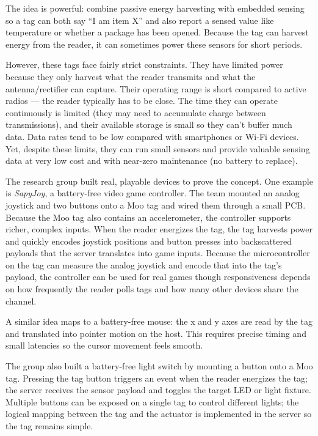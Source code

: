 The idea is powerful: combine passive energy harvesting with embedded sensing so a tag can both say “I am item X” and also report a sensed value like temperature or whether a package has been opened. Because the tag can harvest energy from the reader, it can sometimes power these sensors for short periods.

However, these tags face fairly strict constraints. They have limited power because they only harvest what the reader transmits and what the antenna/rectifier can capture. Their operating range is short compared to active radios — the reader typically has to be close. The time they can operate continuously is limited (they may need to accumulate charge between transmissions), and their available storage is small so they can’t buffer much data. Data rates tend to be low compared with smartphones or Wi-Fi devices. Yet, despite these limits, they can run small sensors and provide valuable sensing data at very low cost and with near-zero maintenance (no battery to replace).

The research group built real, playable devices to prove the concept.
One example is \textit{SapyJoy}, a battery-free video game controller. The team mounted an analog joystick and two buttons onto a Moo tag and wired them through a small PCB. Because the Moo tag also contains an accelerometer, the controller supports richer, complex inputs. When the reader energizes the tag, the tag harvests power and quickly encodes joystick positions and button presses into backscattered payloads that the server translates into game inputs. Because the microcontroller on the tag can measure the analog joystick and encode that into the tag’s payload, the controller can be used for real games though responsiveness depends on how frequently the reader polls tags and how many other devices share the channel.

A similar idea maps to a battery-free mouse: the x and y axes are read by the tag and translated into pointer motion on the host. This requires precise timing and small latencies so the cursor movement feels smooth.

The group also built a battery-free light switch by mounting a button onto a Moo tag. Pressing the tag button triggers an event when the reader energizes the tag; the server receives the sensor payload and toggles the target LED or light fixture. Multiple buttons can be exposed on a single tag to control different lights; the logical mapping between the tag and the actuator is implemented in the server so the tag remains simple.

